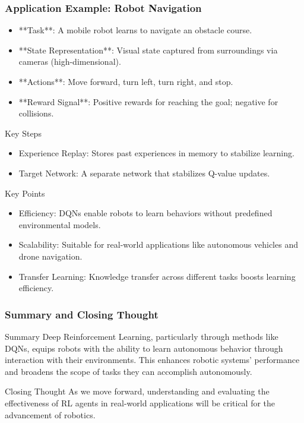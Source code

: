 \documentclass{beamer}
\begin{document}
\begin{frame}[fragile]
    \frametitle{Application Example: Robot Navigation}
    \begin{itemize}
        \item **Task**: A mobile robot learns to navigate an obstacle course.
        \item **State Representation**: Visual state captured from surroundings via cameras (high-dimensional).
        \item **Actions**: Move forward, turn left, turn right, and stop.
        \item **Reward Signal**: Positive rewards for reaching the goal; negative for collisions.
    \end{itemize}

    \begin{block}{Key Steps}
        \begin{itemize}
            \item Experience Replay: Stores past experiences in memory to stabilize learning.
            \item Target Network: A separate network that stabilizes Q-value updates.
        \end{itemize}
    \end{block}
    
    \begin{block}{Key Points}
        \begin{itemize}
            \item Efficiency: DQNs enable robots to learn behaviors without predefined environmental models.
            \item Scalability: Suitable for real-world applications like autonomous vehicles and drone navigation.
            \item Transfer Learning: Knowledge transfer across different tasks boosts learning efficiency.
        \end{itemize}
    \end{block}
\end{frame}

\begin{frame}[fragile]
    \frametitle{Summary and Closing Thought}
    \begin{block}{Summary}
        Deep Reinforcement Learning, particularly through methods like DQNs, equips robots with the ability to learn autonomous behavior through interaction with their environments. This enhances robotic systems' performance and broadens the scope of tasks they can accomplish autonomously.
    \end{block}
    
    \begin{block}{Closing Thought}
        As we move forward, understanding and evaluating the effectiveness of RL agents in real-world applications will be critical for the advancement of robotics.
    \end{block}
\end{frame}
\end{document}
